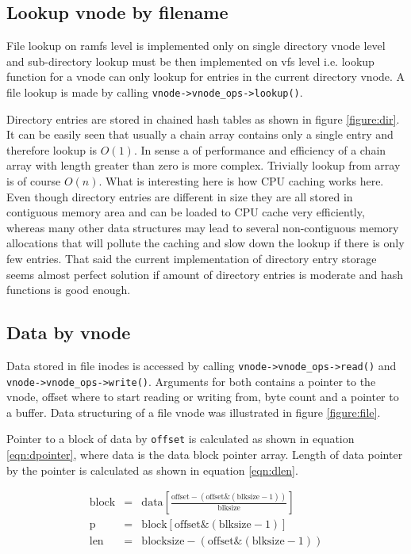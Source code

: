 \subsection{Lookup vnode by filename}

File lookup on ramfs level is implemented only on single directory vnode level
and sub-directory lookup must be then implemented on \acs{vfs} level i.e. lookup
function for a vnode can only lookup for entries in the current directory
vnode. A file lookup is made by calling \verb+vnode->vnode_ops->lookup()+.    

Directory entries are stored in chained hash tables as shown in figure
\ref{figure:dir}. It can be easily seen that usually a chain array contains only
a single entry and therefore lookup is $O(1)$. In sense a of performance and
efficiency of a chain array with length greater than zero is more complex.
Trivially lookup from array is of course $O(n)$. What is interesting here is
how CPU caching works here. Even though directory entries are different in size
they are all stored in contiguous memory area and can be loaded to CPU cache
very efficiently, whereas many other data structures may lead to several
non-contiguous memory allocations that will pollute the caching and slow down
the lookup if there is only few entries. That said the current implementation of
directory entry storage seems almost perfect solution if amount of directory
entries is moderate and hash functions is good enough.\cite{Wikipedia:htable}

\subsection{Data by vnode}

Data stored in file inodes is accessed by calling
\verb+vnode->vnode_ops->read()+ and \verb+vnode->vnode_ops->write()+. Arguments
for both contains a pointer to the vnode, offset where to start reading or
writing from, byte count and a pointer to a buffer. Data structuring of a file
vnode was illustrated in figure \ref{figure:file}.

Pointer to a block of data by \verb+offset+ is calculated as shown in equation
\ref{eqn:dpointer}, where data is the data block pointer array. Length of
data pointer by the pointer is calculated as shown in equation \ref{eqn:dlen}.

\begin{eqnarray}
  \textrm{block} &=& \textrm{data} \left[ \frac{\textrm{offset} -
    (\textrm{offset} \& (\textrm{blksize} - 1))}{\textrm{blksize}}
    \right] \\
  \textrm{p}     &=& \textrm{block} \left[ \textrm{offset} \& (\textrm{blksize} - 1)
    \right] \label{eqn:dpointer} \\
  \textrm{len}  &=& \textrm{blocksize} - (\textrm{offset} \& (\textrm{blksize} - 1)) \label{eqn:dlen}
\end{eqnarray}

